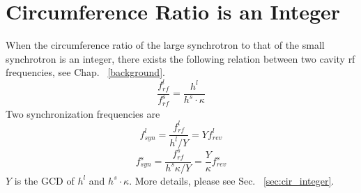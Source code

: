 %
%
% 
%
\section{Circumference Ratio is an Integer}
\label{sec:integ}
When the circumference ratio of the large synchrotron to that of the small synchrotron is an integer, there exists the following relation between two cavity rf frequencies, see Chap. ~\ref{background}. 
\begin{equation}
\frac{f_{\mathit{rf}}^{l}}{f_{\mathit{rf}}^{s}}= \frac{h^l}{h^s \cdot \kappa}\label{cir_int_1}
\end{equation}
Two synchronization frequencies are
\begin{equation}
f_{\mathit{syn}}^{l}=\frac{f_{\mathit{rf}}^{l}}{h^{l}/Y}=Y f_{\mathit{rev}}^{l} \label{synch_freq1_r}
\end{equation}
\begin{equation}
f_{\mathit{syn}}^{s}=\frac{f_{\mathit{rf}}^{s}}{h^{s}\kappa/Y}=\frac{Y}{\kappa} f_{\mathit{rev}}^{s} \label{synch_freq2_r}
\end{equation}
$Y$ is the \gls{GCD} of $h^l$ and $h^s \cdot \kappa$. More details, please see Sec. ~\ref{sec:cir_integer}.

